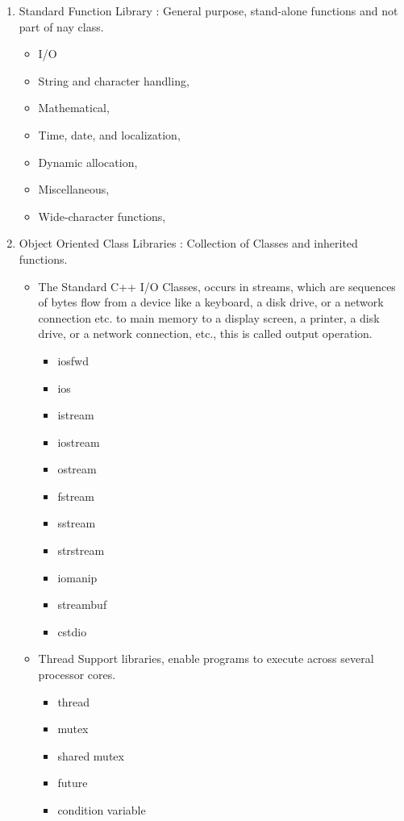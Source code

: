 \documentclass[12pt]{article}
\begin{document}
{\begin{enumerate}
\item Standard Function Library : General purpose, stand-alone functions and not part of nay class.\cite{cppreferenceLib}
	\begin{itemize}
	\item I/O
	\item String and character handling,
	\item Mathematical,
	\item Time, date, and localization,
	\item Dynamic allocation,
	\item Miscellaneous,
	\item Wide-character functions,
	\end{itemize}
\item Object Oriented Class Libraries : Collection of Classes and inherited functions.\cite{cppreferenceLib}
	\begin{itemize}
	\item The Standard C++ I/O Classes, occurs in streams, which are sequences of bytes flow from a device like a keyboard, a disk drive, or a network connection etc. to main memory to a display screen, a printer, a disk drive, or a network connection, etc., this is called output operation.\cite{cppreferenceLib}
		\begin{itemize}
		\item iosfwd
		\item ios
		\item istream
		\item iostream
		\item ostream
		\item fstream
		\item sstream
		\item strstream
		\item iomanip
		\item streambuf
		\item cstdio
		\end{itemize}
		
	\item Thread Support libraries, enable programs to execute across several processor cores.\cite{cppreferenceLib}
		\begin{itemize}
		\item thread
		\item mutex
		\item shared mutex
		\item future
		\item condition variable
		\end{itemize}
		

\end{itemize}
\end{enumerate}}
\end{document}

